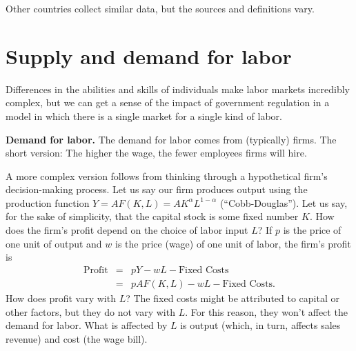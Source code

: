 Other countries collect similar data, but the sources and definitions vary.

\begin{comment}
In a typical case, the categories are expanded as
follows: (ia)~employed in same job as last period, (ib)~employed
in different job, (ii)~unemployed, and (iii)~not in labor force.
Related information is collected from firms.  A firm is said to
create jobs if it lists more positions (filled or not) than in the
previous period and destroy jobs if there are fewer.  Total {\it
job creation\/} for the economy as a whole is the total number of
positions added by firms that create jobs.  Similarly, total {\it
job destruction\/} is the total number of positions lost by firms
that destroy jobs.  The astonishing feature of flow data is how
much churning goes on: millions of people gain and lose jobs every
month, and millions of jobs are created and destroyed, whether the
economy is growing or shrinking.
\end{comment}



\section{Supply and demand for labor}

Differences in the abilities and skills of individuals
make labor markets incredibly complex,
but we can get a sense of the impact of government regulation
in a model in which there is a single market for a single kind of labor.

\textbf{Demand for labor.}
The demand for labor comes from (typically) firms.
The short version:  The higher the wage,
the fewer employees firms will hire.

A more complex version follows from thinking through
a hypothetical firm's decision-making process.
Let us say our firm produces output using the production function
$Y= AF(K,L)=AK^{\alpha}L^{1-\alpha}$ (``Cobb-Douglas'').
Let us say, for the sake of simplicity, that the
capital stock is some fixed number $K$. How does the firm's profit
depend on the choice of labor input $L$? If $p$ is the price of
one unit of output and $w$ is the price (wage) of one unit of
labor, the firm's profit is
%
\begin{eqnarray*}
    \mbox{Profit} &=& p Y - w L - \mbox{Fixed Costs} \\
                  &=& p A F(K,L) - w L - \mbox{Fixed Costs} .
\end{eqnarray*}
%
How does profit vary with $L$? The fixed costs might be attributed
to capital or other factors, but they do not vary with $L$.
For this reason, they won't affect the demand for labor.  What is
affected by $L$ is output (which, in turn, affects sales revenue)
and cost (the wage bill).

